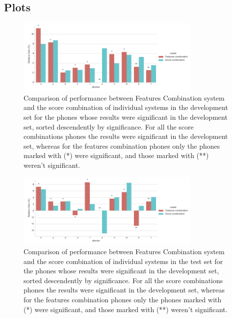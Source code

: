 \subsection{Plots}

\begin{figure}[H]
	\centering
	\includegraphics[width=0.8\textwidth]{files/figures/results/relatives/relatives-fusion-systems-dev-mcnemar.png}
	\caption{Comparison of performance between Features Combination system and the score combination
	of individual systems in the development set for the phones whose results were significant 
	in the development set, sorted descendently by significance. For all the score combinations phones the results were significant
	in the development set,
	whereas for the features combination phones only the phones marked with (*) were significant, 
	and those marked with (**) weren't significant.}
	\label{fig:fusionMcnemarDev}
\end{figure}

\begin{figure}[H]
	\centering
	\includegraphics[width=0.8\textwidth]{files/figures/results/relatives/relative-fusion-systems-heldout-mcnemar.png}
	\caption{Comparison of performance between Features Combination system and the score combination
	of individual systems in the test set for the phones whose results were significant 
	in the development set, sorted descendently by significance. For all the score combinations phones the results were significant
	in the development set,
	whereas for the features combination phones only the phones marked with (*) were significant, 
	and those marked with (**) weren't significant.}
	\label{fig:fusionMcnemarTest}
\end{figure}
